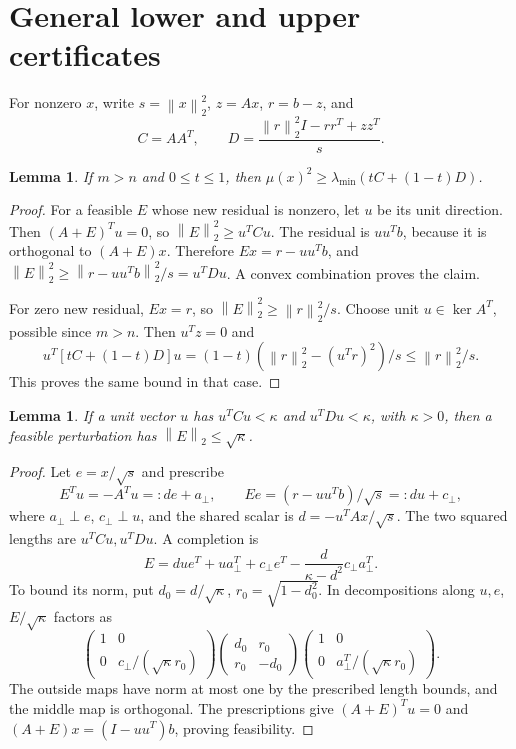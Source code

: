 \documentclass[11pt]{article}
\newtheorem{lemma}[theorem]{Lemma}
\newcommand{\norm}[1]{\left\lVert#1\right\rVert}
\begin{document}
\section{General lower and upper certificates}
For nonzero $x$, write $s=\norm x_2^2$, $z=Ax$, $r=b-z$, and
\[C=AA^T,\qquad D=\frac{\norm r_2^2I-rr^T+zz^T}{s}.\]
\begin{lemma}
If $m>n$ and $0\le t\le1$, then $\mu(x)^2\ge\lambda_{\min}(tC+(1-t)D)$.
\end{lemma}
\begin{proof}
For a feasible $E$ whose new residual is nonzero, let $u$ be its unit direction. Then $(A+E)^Tu=0$, so $\norm E_2^2\ge u^TCu$. The residual is $uu^Tb$, because it is orthogonal to $(A+E)x$. Therefore $Ex=r-uu^Tb$, and $\norm E_2^2\ge\norm{r-uu^Tb}_2^2/s=u^TDu$. A convex combination proves the claim.

For zero new residual, $Ex=r$, so $\norm E_2^2\ge\norm r_2^2/s$. Choose unit $u\in\ker A^T$, possible since $m>n$. Then $u^Tz=0$ and
\[
u^T[tC+(1-t)D]u=(1-t)(\norm r_2^2-(u^Tr)^2)/s\le\norm r_2^2/s.
\]
This proves the same bound in that case.
\end{proof}
\begin{lemma}
If a unit vector $u$ has $u^TCu<\kappa$ and $u^TDu<\kappa$, with $\kappa>0$, then a feasible perturbation has $\norm E_2\le\sqrt\kappa$.
\end{lemma}
\begin{proof}
Let $e=x/\sqrt s$ and prescribe
\[
E^Tu=-A^Tu=:de+a_\perp,\qquad
Ee=(r-uu^Tb)/\sqrt s=:du+c_\perp,
\]
where $a_\perp\perp e$, $c_\perp\perp u$, and the shared scalar is $d=-u^TAx/\sqrt s$. The two squared lengths are $u^TCu,u^TDu$. A completion is
\[
E=due^T+ua_\perp^T+c_\perp e^T-\frac{d}{\kappa-d^2}c_\perp a_\perp^T.
\]
To bound its norm, put $d_0=d/\sqrt\kappa$, $r_0=\sqrt{1-d_0^2}$. In decompositions along $u,e$, $E/\sqrt\kappa$ factors as
\[
\begin{pmatrix}1&0\\0&c_\perp/(\sqrt\kappa r_0)\end{pmatrix}
\begin{pmatrix}d_0&r_0\\r_0&-d_0\end{pmatrix}
\begin{pmatrix}1&0\\0&a_\perp^T/(\sqrt\kappa r_0)\end{pmatrix}.
\]
The outside maps have norm at most one by the prescribed length bounds, and the middle map is orthogonal. The prescriptions give $(A+E)^Tu=0$ and $(A+E)x=(I-uu^T)b$, proving feasibility.
\end{proof}
\end{document}
